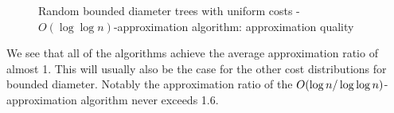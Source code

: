 \begin{figure}[ht]
\centering
{}
\caption{Random bounded diameter trees with uniform costs - $O(\log \log n)$-approximation algorithm: approximation quality}
\label{fig:bounded_diameter_c_uniform_kup}
\end{figure}
\FloatBarrier
We see that all of the algorithms achieve the average approximation ratio of almost 1. This will usually also be the case for the other cost distributions for bounded diameter. Notably the approximation ratio of the $O\mathopen{}\left( \log n/\log \log n \right)$-approximation algorithm never exceeds 1.6.
